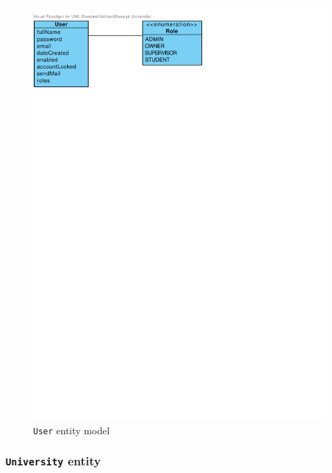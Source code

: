 \begin{figure}[h]
    \centering
        \includegraphics[trim=0 675 250 30, clip, keepaspectratio]{./images/domain-user-entity.pdf}
    \caption{\texttt{User} entity model}
    \label{fig:domain-user-entity}
\end{figure}

\subsubsection{\texttt{University} entity}

\faketext[24]